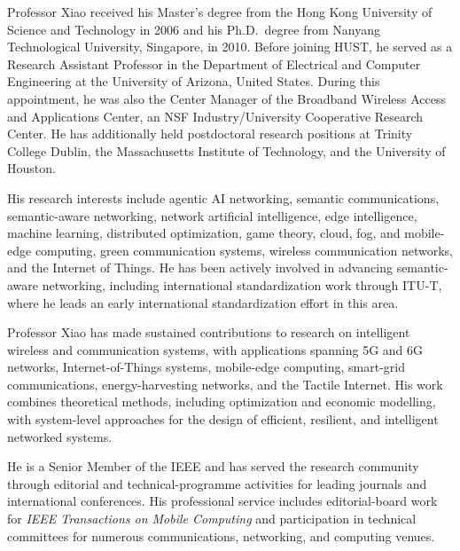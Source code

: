 \documentclass[10pt,a4paper]{article}
\begin{document}
\vspace{1em}

Professor Xiao received his Master's degree from the Hong Kong University of Science and Technology in 2006 and his Ph.D.\ degree from Nanyang Technological University, Singapore, in 2010. Before joining HUST, he served as a Research Assistant Professor in the Department of Electrical and Computer Engineering at the University of Arizona, United States. During this appointment, he was also the Center Manager of the Broadband Wireless Access and Applications Center, an NSF Industry/University Cooperative Research Center. He has additionally held postdoctoral research positions at Trinity College Dublin, the Massachusetts Institute of Technology, and the University of Houston.

\vspace{1em}

His research interests include agentic AI networking, semantic communications, semantic-aware networking, network artificial intelligence, edge intelligence, machine learning, distributed optimization, game theory, cloud, fog, and mobile-edge computing, green communication systems, wireless communication networks, and the Internet of Things. He has been actively involved in advancing semantic-aware networking, including international standardization work through ITU-T, where he leads an early international standardization effort in this area.

\vspace{1em}

Professor Xiao has made sustained contributions to research on intelligent wireless and communication systems, with applications spanning 5G and 6G networks, Internet-of-Things systems, mobile-edge computing, smart-grid communications, energy-harvesting networks, and the Tactile Internet. His work combines theoretical methods, including optimization and economic modelling, with system-level approaches for the design of efficient, resilient, and intelligent networked systems.

\vspace{1em}

He is a Senior Member of the IEEE and has served the research community through editorial and technical-programme activities for leading journals and international conferences. His professional service includes editorial-board work for \textit{IEEE Transactions on Mobile Computing} and participation in technical committees for numerous communications, networking, and computing venues.
\end{document}
